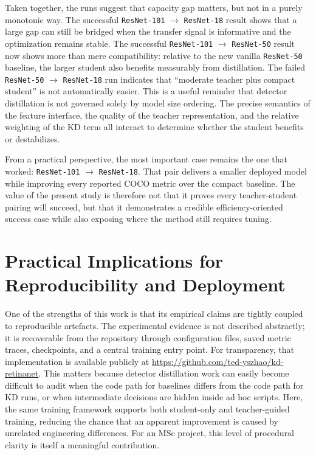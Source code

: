 Taken together, the runs suggest that capacity gap matters, but not in a purely monotonic way. The successful \texttt{ResNet-101} $\rightarrow$ \texttt{ResNet-18} result shows that a large gap can still be bridged when the transfer signal is informative and the optimization remains stable. The successful \texttt{ResNet-101} $\rightarrow$ \texttt{ResNet-50} result now shows more than mere compatibility: relative to the new vanilla \texttt{ResNet-50} baseline, the larger student also benefits measurably from distillation. The failed \texttt{ResNet-50} $\rightarrow$ \texttt{ResNet-18} run indicates that ``moderate teacher plus compact student'' is not automatically easier. This is a useful reminder that detector distillation is not governed solely by model size ordering. The precise semantics of the feature interface, the quality of the teacher representation, and the relative weighting of the KD term all interact to determine whether the student benefits or destabilizes.

From a practical perspective, the most important case remains the one that worked: \texttt{ResNet-101} $\rightarrow$ \texttt{ResNet-18}. That pair delivers a smaller deployed model while improving every reported COCO metric over the compact baseline. The value of the present study is therefore not that it proves every teacher-student pairing will succeed, but that it demonstrates a credible efficiency-oriented success case while also exposing where the method still requires tuning.

\section{Practical Implications for Reproducibility and Deployment}

One of the strengths of this work is that its empirical claims are tightly coupled to reproducible artefacts. The experimental evidence is not described abstractly; it is recoverable from the repository through configuration files, saved metric traces, checkpoints, and a central training entry point. For transparency, that implementation is available publicly at \url{https://github.com/ted-yszhao/kd-retinanet}. This matters because detector distillation work can easily become difficult to audit when the code path for baselines differs from the code path for KD runs, or when intermediate decisions are hidden inside ad hoc scripts. Here, the same training framework supports both student-only and teacher-guided training, reducing the chance that an apparent improvement is caused by unrelated engineering differences. For an MSc project, this level of procedural clarity is itself a meaningful contribution.

